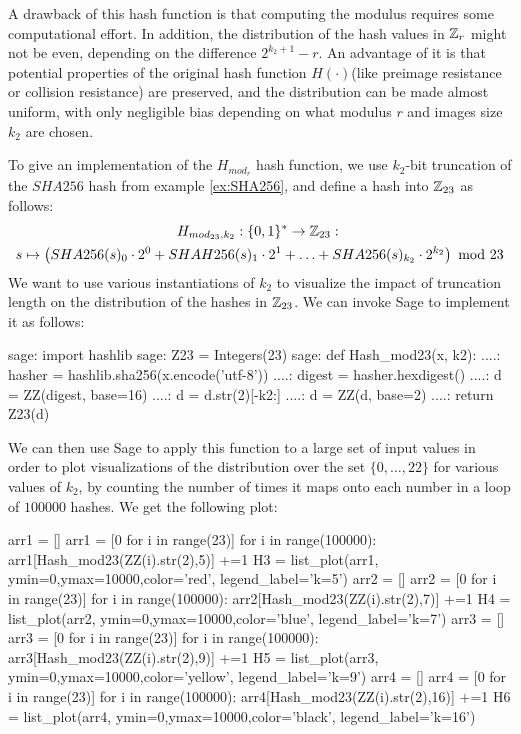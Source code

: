 A drawback of this hash function is that computing the modulus requires some computational effort. In addition, the distribution of the hash values in $\mathbb{Z}_r$ might not be even, depending on the difference $2^{k_2+1}-r$. An advantage of it is that potential properties of the original hash function $H(\cdot)$(like preimage resistance or collision resistance) are preserved, and the distribution can be made almost uniform, with only negligible bias depending on what modulus $r$ and images size $k_2$ are  chosen.
\begin{example} To give an implementation of the $H_{mod_r}$ hash function, we use  $k_2$-bit truncation of the $SHA256$ hash from example \ref{ex:SHA256}, and define a hash into $\mathbb{Z}_{23}$ as follows:
\begin{multline*}
H_{mod_{23},k_2}: \{0,1\}^* \to \mathbb{Z}_{23}:\; \\
s\mapsto
\left(SHA256(s)_0\cdot 2^0 + SHAH256(s)_1\cdot 2^1 + \ldots + SHA256(s)_{k_2}\cdot 2^{k_2}\right) \text{ mod } 23
\end{multline*}
We want to use various instantiations of $k_2$ to visualize the impact of truncation length on the distribution of the hashes in $\mathbb{Z}_{23}$. We can invoke Sage to implement it as follows:
\begin{sagecommandline}
sage: import hashlib
sage: Z23 = Integers(23)
sage: def Hash_mod23(x, k2):
....:     hasher = hashlib.sha256(x.encode('utf-8'))
....:     digest = hasher.hexdigest()
....:     d = ZZ(digest, base=16)
....:     d = d.str(2)[-k2:]
....:     d = ZZ(d, base=2)
....:     return Z23(d)
\end{sagecommandline}

We can then use Sage to apply this function to a large set of input values in order to plot visualizations of the distribution over the set $\{0,\ldots,22\}$ for various values of $k_2$, by counting the number of times it maps onto each number in a loop of $100000$ hashes. We get the following plot:
\begin{sagesilent}
arr1 = []
arr1 = [0 for i in range(23)]
for i in range(100000):
    arr1[Hash_mod23(ZZ(i).str(2),5)] +=1
H3 = list_plot(arr1, ymin=0,ymax=10000,color='red', legend_label='k=5')
arr2 = []
arr2 = [0 for i in range(23)]
for i in range(100000):
    arr2[Hash_mod23(ZZ(i).str(2),7)] +=1
H4 = list_plot(arr2, ymin=0,ymax=10000,color='blue', legend_label='k=7')
arr3 = []
arr3 = [0 for i in range(23)]
for i in range(100000):
    arr3[Hash_mod23(ZZ(i).str(2),9)] +=1
H5 = list_plot(arr3, ymin=0,ymax=10000,color='yellow', legend_label='k=9')
arr4 = []
arr4 = [0 for i in range(23)]
for i in range(100000):
    arr4[Hash_mod23(ZZ(i).str(2),16)] +=1
H6 = list_plot(arr4, ymin=0,ymax=10000,color='black', legend_label='k=16')
\end{sagesilent}
\begin{center}
\end{center}
\end{example}
